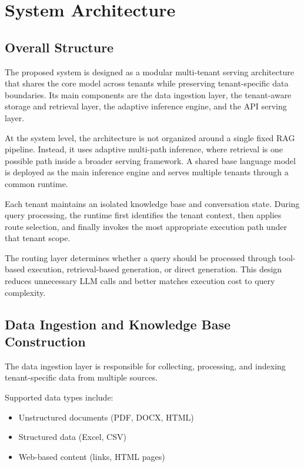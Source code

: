 \section{System Architecture}
\subsection{Overall Structure}

The proposed system is designed as a modular multi-tenant serving architecture that shares the core model across tenants while preserving tenant-specific data boundaries. Its main components are the data ingestion layer, the tenant-aware storage and retrieval layer, the adaptive inference engine, and the API serving layer.

At the system level, the architecture is not organized around a single fixed RAG pipeline. Instead, it uses adaptive multi-path inference, where retrieval is one possible path inside a broader serving framework. A shared base language model is deployed as the main inference engine and serves multiple tenants through a common runtime.

Each tenant maintains an isolated knowledge base and conversation state. During query processing, the runtime first identifies the tenant context, then applies route selection, and finally invokes the most appropriate execution path under that tenant scope.

The routing layer determines whether a query should be processed through tool-based execution, retrieval-based generation, or direct generation. This design reduces unnecessary LLM calls and better matches execution cost to query complexity.

\subsection{Data Ingestion and Knowledge Base Construction}

The data ingestion layer is responsible for collecting, processing, and indexing tenant-specific data from multiple sources.

Supported data types include:
\begin{itemize}
    \item Unstructured documents (PDF, DOCX, HTML)
    \item Structured data (Excel, CSV)
    \item Web-based content (links, HTML pages)
\end{itemize}

